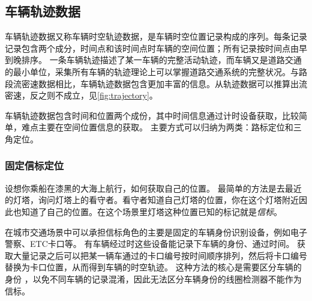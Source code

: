 \subsection{车辆轨迹数据}
车辆轨迹数据又称车辆时空轨迹数据，是车辆时空位置记录构成的序列。每条记录记录包含两个成分，时间点和该时间点时车辆的空间位置；所有记录按时间点由早到晚排序。
一条车辆轨迹描述了某一车辆的完整活动轨迹，而车辆又是道路交通的最小单位，采集所有车辆的轨迹理论上可以掌握道路交通系统的完整状况。与路段流密速数据相比，车辆轨迹数据包含更加丰富的信息。从轨迹数据可以推算出流密速，反之则不成立，见\cref{fig:trajectory}。

车辆轨迹数据包含时间和位置两个成份，其中时间信息通过计时设备获取，比较简单，难点主要在空间位置信息的获取。
主要方式可以归纳为两类：路标定位和三角定位。

\subsubsection{固定信标定位}
设想你乘船在漆黑的大海上航行，如何获取自己的位置。
最简单的方法是去最近的灯塔，询问灯塔上的看守者。看守者知道自己灯塔的位置，你在这个灯塔附近因此也知道了自己的位置。在这个场景里灯塔这种位置已知的标记就是\emph{信标}。

在城市交通场景中可以承担信标角色的主要是固定的车辆身份识别设备，例如电子警察、ETC卡口等。
有车辆经过时这些设备能记录下车辆的身份、通过时间。
获取大量记录之后可以把某一辆车通过的卡口编号按时间顺序排列，然后将卡口编号替换为卡口位置，从而得到车辆的时空轨迹。
这种方法的核心是需要区分车辆的身份%
%
，以免不同车辆的记录混淆，因此无法区分车辆身份的线圈检测器不能作为信标。

